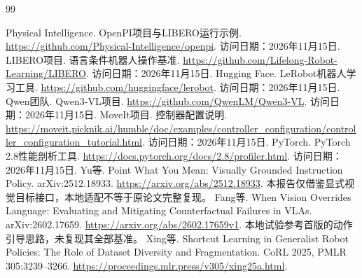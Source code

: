 \begin{thebibliography}{99}
 Physical Intelligence. OpenPI项目与LIBERO运行示例. \url{https://github.com/Physical-Intelligence/openpi}. 访问日期：2026年11月15日.
 LIBERO项目. 语言条件机器人操作基准. \url{https://github.com/Lifelong-Robot-Learning/LIBERO}. 访问日期：2026年11月15日.
 Hugging Face. LeRobot机器人学习工具. \url{https://github.com/huggingface/lerobot}. 访问日期：2026年11月15日.
 Qwen团队. Qwen3-VL项目. \url{https://github.com/QwenLM/Qwen3-VL}. 访问日期：2026年11月15日.
 MoveIt项目. 控制器配置说明. \url{https://moveit.picknik.ai/humble/doc/examples/controller_configuration/controller_configuration_tutorial.html}. 访问日期：2026年11月15日.
 PyTorch. PyTorch 2.8性能剖析工具. \url{https://docs.pytorch.org/docs/2.8/profiler.html}. 访问日期：2026年11月15日.
 Yu等. Point What You Mean: Visually Grounded Instruction Policy. arXiv:2512.18933. \url{https://arxiv.org/abs/2512.18933}. 本报告仅借鉴显式视觉目标接口，本地适配不等于原论文完整复现。
 Fang等. When Vision Overrides Language: Evaluating and Mitigating Counterfactual Failures in VLAs. arXiv:2602.17659. \url{https://arxiv.org/abs/2602.17659v1}. 本地试验参考首版的动作引导思路，未复现其全部基准。
 Xing等. Shortcut Learning in Generalist Robot Policies: The Role of Dataset Diversity and Fragmentation. CoRL 2025, PMLR 305:3239--3266. \url{https://proceedings.mlr.press/v305/xing25a.html}.
\end{thebibliography}
